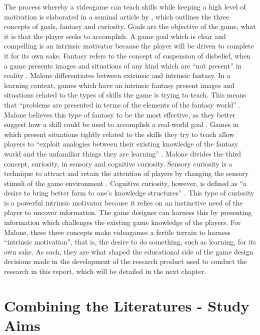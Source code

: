\documentclass{l4proj}
\begin{document}
The process whereby a videogame can teach skills while keeping a high level of motivation is elaborated in a seminal article by \citet{malone1980makes}, which outlines the three concepts of goals, fantasy and curiosity. Goals are the objective of the game, what it is that the player seeks to accomplish. A game goal which is clear and compelling is an intrinsic motivator because the player will be driven to complete it for its own sake. Fantasy refers to the concept of suspension of disbelief, when a game presents images and situations of any kind which are “not present” in reality \citep{malone1980makes}. Malone differentiates between extrinsic and intrinsic fantasy. In a learning context, games which have an intrinsic fantasy present images and situations related to the types of skills the game is trying to teach. This means that “problems are presented in terms of the elements of the fantasy world” \citep{malone1980makes}. Malone believes this type of fantasy to be the most effective, as they better suggest how a skill could be used to accomplish a real-world goal \citep{malone1980makes}. Games in which present situations tightly related to the skills they try to teach allow players to “exploit analogies between their existing knowledge of the fantasy world and the unfamiliar things they are learning” \citep{malone1980makes}.  Malone divides the third concept, curiosity, in sensory and cognitive curiosity. Sensory curiosity is a technique to attract and retain the attention of players by changing the sensory stimuli of the game environment \citep{malone1980makes}. Cognitive curiosity, however, is defined as “a desire to bring better form to one's knowledge structures” \citep{malone1980makes}. This type of curiosity is a powerful intrinsic motivator because it relies on an instinctive need of the player to uncover information. The game designer can harness this by presenting information which challenges the existing game knowledge of the players. For Malone, these three concepts make videogames a fertile terrain to harness “intrinsic motivation”, that is, the desire to do something, such as learning, for its own sake. As such, they are what shaped the educational side of the game design decisions made in the development of the research product used to conduct the research in this report, which will be detailed in the next chapter. 

\section{Combining the Literatures - Study Aims}
\end{document}
